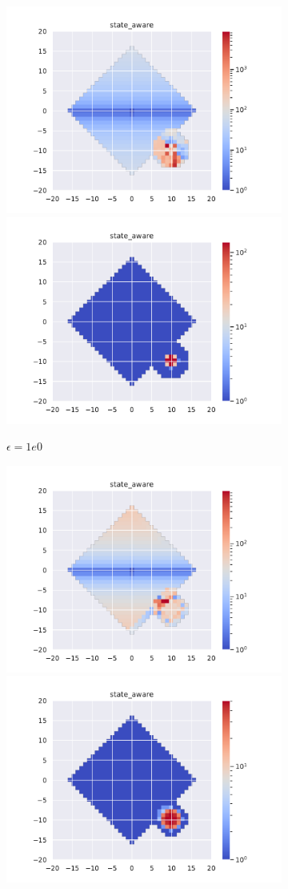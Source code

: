 \documentclass[runningheads]{llncs}
\begin{document}
\begin{figure}[H]
\ContinuedFloat
    \centering
    \begin{subfigure}[b]{\linewidth}
        \centering
        \includegraphics[width=0.49\linewidth]{img/epsilon/1e0/updates_state_aware.pdf}
        \includegraphics[width=0.49\linewidth]{img/epsilon/1e0/occupations_state_aware.pdf}
        \caption{$\epsilon=1e0$}
    \end{subfigure}
    \begin{subfigure}[b]{\linewidth}
        \centering
        \includegraphics[width=0.49\linewidth]{img/epsilon/1e1/updates_state_aware.pdf}
        \includegraphics[width=0.49\linewidth]{img/epsilon/1e1/occupations_state_aware.pdf}

\end{subfigure}
\end{figure}
\end{document}
